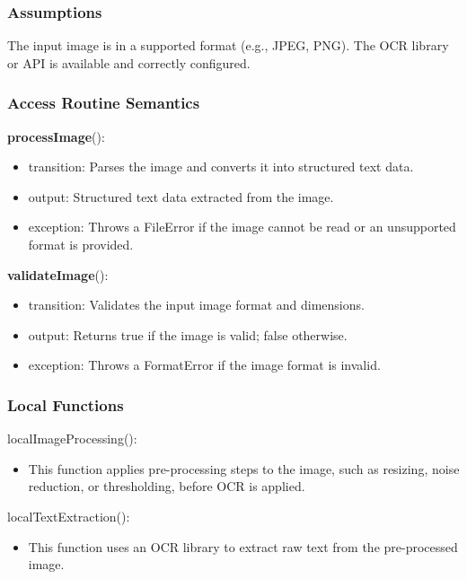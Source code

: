 \documentclass[12pt, titlepage]{article}
\begin{document}
\subsubsection{Assumptions}

The input image is in a supported format (e.g., JPEG, PNG). The OCR library or API is available and correctly configured.

\subsubsection{Access Routine Semantics}

\noindent \textbf{processImage}():
\begin{itemize}
\item transition: Parses the image and converts it into structured text data.
\item output: Structured text data extracted from the image.
\item exception: Throws a FileError if the image cannot be read or an unsupported format is provided.
\end{itemize}

\noindent \textbf{validateImage}():
\begin{itemize}
\item transition: Validates the input image format and dimensions.
\item output: Returns true if the image is valid; false otherwise.
\item exception: Throws a FormatError if the image format is invalid.
\end{itemize}

\subsubsection{Local Functions}

localImageProcessing():
\begin{itemize}
\item This function applies pre-processing steps to the image, such as resizing, noise reduction, or thresholding, before OCR is applied.
\end{itemize}

localTextExtraction():
\begin{itemize}
\item This function uses an OCR library to extract raw text from the pre-processed image.
\end{itemize}

\newpage
\end{document}
